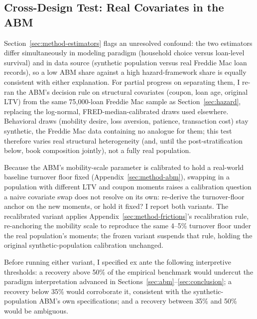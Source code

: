\documentclass[12pt]{article}
\begin{document}
\subsection{Cross-Design Test: Real Covariates in the ABM}\label{sec:robustness-crossdesign}

Section~\ref{sec:method-estimators} flags an unresolved confound: the two estimators differ simultaneously in modeling paradigm (household choice versus loan-level survival) and in data source (synthetic population versus real Freddie Mac loan records), so a low ABM share against a high hazard-framework share is equally consistent with either explanation. For partial progress on separating them, I re-ran the ABM's decision rule on structural covariates (coupon, loan age, original LTV) from the same 75,000-loan Freddie Mac sample as Section~\ref{sec:hazard}, replacing the log-normal, FRED-median-calibrated draws used elsewhere. Behavioral draws (mobility desire, loss aversion, patience, transaction cost) stay synthetic, the Freddie Mac data containing no analogue for them; this test therefore varies real structural heterogeneity (and, until the post-stratification below, book composition jointly), not a fully real population.

Because the ABM's mobility-scale parameter is calibrated to hold a real-world baseline turnover floor fixed (Appendix~\ref{sec:method-abm}), swapping in a population with different LTV and coupon moments raises a calibration question a naive covariate swap does not resolve on its own: re-derive the turnover-floor anchor on the new moments, or hold it fixed? I report both variants. The recalibrated variant applies Appendix~\ref{sec:method-frictions}'s recalibration rule, re-anchoring the mobility scale to reproduce the same 4--5\% turnover floor under the real population's moments; the frozen variant suspends that rule, holding the original synthetic-population calibration unchanged.

Before running either variant, I specified ex ante the following interpretive thresholds: a recovery above 50\% of the empirical benchmark would undercut the paradigm interpretation advanced in Sections~\ref{sec:abm}--\ref{sec:conclusion}; a recovery below 35\% would corroborate it, consistent with the synthetic-population ABM's own specifications; and a recovery between 35\% and 50\% would be ambiguous.
\end{document}
